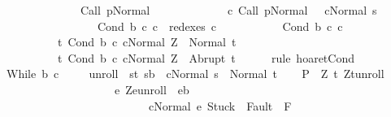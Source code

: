 \begin{isabellebody}
\ \ \ \ \ \ \ \ \ \ \ \ \ \ {\isasymGamma}{\isasymturnstile}Call\ p{\isasymdown}Normal\ {\isasymsigma}\ {\isasymand}\isanewline
\ \ \ \ \ \ \ \ \ \ \ {\isacharparenleft}{\isasymexists}c{\isacharprime}{\isachardot}\ {\isasymGamma}{\isasymturnstile}{\isacharparenleft}Call\ p{\isacharcomma}Normal\ {\isasymsigma}{\isacharparenright}\ {\isasymrightarrow}\isactrlsup {\isacharplus}\ {\isacharparenleft}c{\isacharprime}{\isacharcomma}Normal\ s{\isacharparenright}\ {\isasymand}\ \isanewline
\ \ \ \ \ \ \ \ \ \ \ \ \ \ \ \ \ Cond\ b\ c{}\ c{}\ {\isasymin}\ redexes\ c{\isacharprime}{\isacharparenright}{\isacharbraceright}\isanewline
\ \ \ \ \ \ \ \ \ \ \ {\isacharparenleft}Cond\ b\ c{}\ c{}{\isacharparenright}\ \isanewline
\ \ \ \ \ \ \ \ \ \ {\isacharbraceleft}t{\isachardot}\ {\isasymGamma}{\isasymturnstile}{\isasymlangle}Cond\ b\ c{}\ c{}{\isacharcomma}Normal\ Z{\isasymrangle}\ {\isasymRightarrow}\ Normal\ t{\isacharbraceright}{\isacharcomma}\isanewline
\ \ \ \ \ \ \ \ \ \ {\isacharbraceleft}t{\isachardot}\ {\isasymGamma}{\isasymturnstile}{\isasymlangle}Cond\ b\ c{}\ c{}{\isacharcomma}Normal\ Z{\isasymrangle}\ {\isasymRightarrow}\ Abrupt\ t{\isacharbraceright}{\isachardoublequoteclose}\isanewline
\ \ \ \ \isamarkupfalse%
\ {\isacharparenleft}rule\ hoaret{\isachardot}Cond{\isacharparenright}\ \ \ \ \ \ \ \isanewline
{}\isamarkupfalse%
\isanewline
\ \ \isamarkupfalse%
\ {\isacharparenleft}While\ b\ c{\isacharparenright}\ \isanewline
\ \ \isamarkupfalse%
\ {\isacharquery}unroll\ {\isacharequal}\ {\isachardoublequoteopen}{\isacharparenleft}{\isacharbraceleft}{\isacharparenleft}s{\isacharcomma}t{\isacharparenright}{\isachardot}\ s{\isasymin}b\ {\isasymand}\ {\isasymGamma}{\isasymturnstile}{\isasymlangle}c{\isacharcomma}Normal\ s{\isasymrangle}\ {\isasymRightarrow}\ Normal\ t{\isacharbraceright}{\isacharparenright}\isactrlsup {\isacharasterisk}{\isachardoublequoteclose}\isanewline
\ \ \isamarkupfalse%
\ {\isacharquery}P{\isacharprime}\ {\isacharequal}\ {\isachardoublequoteopen}{\isasymlambda}Z{\isachardot}\ {\isacharbraceleft}t{\isachardot}\ {\isacharparenleft}Z{\isacharcomma}t{\isacharparenright}{\isasymin}{\isacharquery}unroll\ {\isasymand}\ \isanewline
\ \ \ \ \ \ \ \ \ \ \ \ \ \ \ \ \ \ \ \ {\isacharparenleft}{\isasymforall}e{\isachardot}\ {\isacharparenleft}Z{\isacharcomma}e{\isacharparenright}{\isasymin}{\isacharquery}unroll\ {\isasymlongrightarrow}\ e{\isasymin}b\isanewline
\ \ \ \ \ \ \ \ \ \ \ \ \ \ \ \ \ \ \ \ \ \ \ \ \ {\isasymlongrightarrow}\ {\isasymGamma}{\isasymturnstile}{\isasymlangle}c{\isacharcomma}Normal\ e{\isasymrangle}\ {\isasymRightarrow}{\isasymnotin}{\isacharparenleft}{\isacharbraceleft}Stuck{\isacharbraceright}\ {\isasymunion}\ Fault\ {\isacharbackquote}\ {\isacharparenleft}{\isacharminus}F{\isacharparenright}{\isacharparenright}\ {\isasymand}\ \isanewline

\end{isabellebody}

